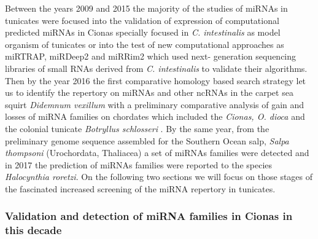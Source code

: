 \documentclass[graybox]{svmult}
\begin{document}
Between the years 2009 and 2015 the majority of the studies of miRNAs in tunicates were focused into the validation of expression of computational predicted miRNAs in Cionas specially focused in \textit{C. intestinalis} as model organism of tunicates or into the test of new computational approaches as miRTRAP, miRDeep2 and miRRim2 which used next- generation sequencing libraries of small RNAs derived from \textit{C. intestinalis} to validate their algorithms. Then by the year 2016 the first comparative homology based search strategy let us to identify the repertory on miRNAs and other ncRNAs in the carpet sea squirt \textit{Didemnum vexillum} with a preliminary comparative analysis of gain and losses of miRNA families on chordates which included the \textit{Cionas, O. dioca} and the colonial tunicate \textit{Botryllus schlosseri} \cite{Velandia-Huerto2016}. By the same year, from the preliminary genome sequence assembled for the Southern Ocean salp, \textit{Salpa thompsoni} (Urochordata, Thaliacea) a set of miRNAs families were detected \cite{Jue2016} and in 2017 the prediction of miRNAs families were reported to the species \textit{Halocynthia roretzi}. On the following two sections we will focus on those stages of the fascinated increased screening of the miRNA repertory in tunicates.

\subsubsection{Validation and detection of miRNA families in Cionas in this decade}
\end{document}
